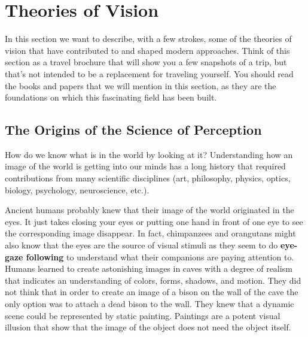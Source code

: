 \section{Theories of Vision}


In this section we want to describe, with a few strokes, some of the theories of vision that have contributed to and shaped modern approaches. Think of this section as a travel brochure that will show you a few snapshots of a trip, but that's not intended to be a replacement for traveling yourself. You should read the books and papers that we will mention in this section, as they are the foundations on which this fascinating field has been built. 



\subsection{The Origins of the Science of Perception}
%

How do we know what is in the world by looking at it? Understanding how an image of the world is getting into our minds has a long history that required contributions from many scientific disciplines (art, philosophy, physics, optics, biology, psychology, neuroscience, etc.).


Ancient humans probably knew that their image of the world originated in the eyes. It just takes closing your eyes or putting one hand in front of one eye to see the corresponding image disappear. In fact, chimpanzees and orangutans might also know that the eyes are the source of visual stimuli as they seem to do {\bf eye-gaze following} to understand what their companions  are paying attention to. 
Humans learned to create astonishing images in caves with a degree of realism that indicates an understanding of colors, forms, shadows, and motion. They did not think that in order to create an image of a bison on the wall of the cave the only option was to attach a dead bison to the wall. They knew that a dynamic scene could be represented by static painting.  Paintings are a potent visual illusion that show that the image of the object does not need the object itself. 

